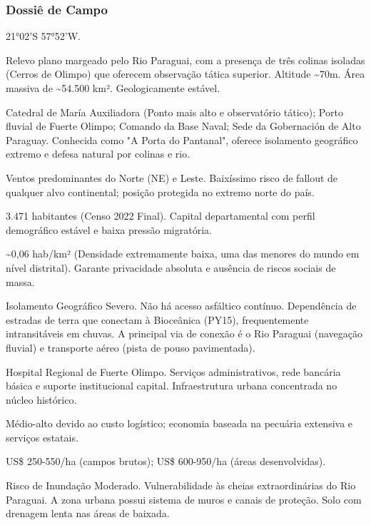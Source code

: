 \subsubsection{Dossiê de Campo}
\begin{description}[style=nextline,leftmargin=0.5cm,font=\bfseries]
\item[Coordenadas]  21°02'S 57°52'W.
\item[Topografia]  Relevo plano margeado pelo Rio Paraguai, com a presença de três colinas isoladas (Cerros de Olimpo) que oferecem observação tática superior. Altitude \textasciitilde 70m. Área massiva de \textasciitilde 54.500 km². Geologicamente estável.
\item[Alvos Estratégicos]  Catedral de María Auxiliadora (Ponto mais alto e observatório tático); Porto fluvial de Fuerte Olimpo; Comando da Base Naval; Sede da Gobernación de Alto Paraguay. Conhecida como "A Porta do Pantanal", oferece isolamento geográfico extremo e defesa natural por colinas e rio.
\item[Fallout]  Ventos predominantes do Norte (NE) e Leste. Baixíssimo risco de fallout de qualquer alvo continental; posição protegida no extremo norte do país.
\item[População]  3.471 habitantes (Censo 2022 Final). Capital departamental com perfil demográfico estável e baixa pressão migratória.
\item[Densidade]  \textasciitilde 0,06 hab/\allowbreak km² (Densidade extremamente baixa, uma das menores do mundo em nível distrital). Garante privacidade absoluta e ausência de riscos sociais de massa.
\item[Vias de Acesso]  Isolamento Geográfico Severo. Não há acesso asfáltico contínuo. Dependência de estradas de terra que conectam à Bioceânica (PY15), frequentemente intransitáveis em chuvas. A principal via de conexão é o Rio Paraguai (navegação fluvial) e transporte aéreo (pista de pouso pavimentada).
\item[Serviços]  Hospital Regional de Fuerte Olimpo. Serviços administrativos, rede bancária básica e suporte institucional capital. Infraestrutura urbana concentrada no núcleo histórico.
\item[Custo de Vida]  Médio-alto devido ao custo logístico; economia baseada na pecuária extensiva e serviços estatais.
\item[Preço da Terra]  US\$ 250-550/\allowbreak ha (campos brutos); US\$ 600-950/\allowbreak ha (áreas desenvolvidas).
\item[Hidrologia]  Risco de Inundação Moderado. Vulnerabilidade às cheias extraordinárias do Rio Paraguai. A zona urbana possui sistema de muros e canais de proteção. Solo com drenagem lenta nas áreas de baixada.

\end{description}
